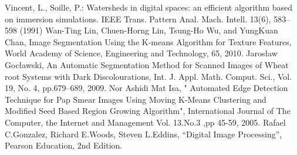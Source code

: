 \documentclass[conference]{IEEEtran}
\begin{document}
\begin{thebibliography}{00}
 Vincent, L., Soille, P.: Watersheds in digital spaces: an efficient algorithm based on immersion simulations. IEEE Trans. Pattern Anal. Mach. Intell. 13(6), 583–598 (1991)
 Wan-Ting Lin, Chuen-Horng Lin, Tsung-Ho Wu, and YungKuan Chan, Image Segmentation Using the K-means Algorithm for Texture Features, World Academy of Science, Engineering and Technology, 65, 2010. 
 Jarosław Gocławski, An Automatic Segmentation Method for Scanned Images of Wheat root Systems with Dark Discolourations, Int. J. Appl. Math. Comput. Sci., Vol. 19, No. 4, pp.679–689, 2009. 
 Nor Ashidi Mat Isa, " Automated Edge Detection Technique for Pap Smear Images Using Moving K-Means Clustering and Modified Seed Based Region Growing Algorithm", International Journal of The Computer, the Internet and Management Vol. 13.No.3 ,pp 45-59, 2005. 
 Rafael C.Gonzalez, Richard E.Woods, Steven L.Eddins, “Digital Image Processing”, Pearson Education, 2nd Edition. 

\end{thebibliography}
\end{document}
